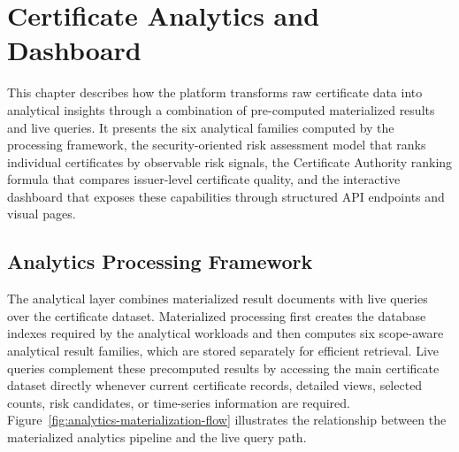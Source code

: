 
\chapter{Certificate Analytics and Dashboard}
\label{chap:analytics-api-dashboard}

This chapter describes how the platform transforms raw certificate data into
analytical insights through a combination of pre-computed materialized results
and live queries. It presents the six analytical families computed by the
processing framework, the security-oriented risk assessment model that ranks
individual certificates by observable risk signals, the Certificate Authority
ranking formula that compares issuer-level certificate quality, and the
interactive dashboard that exposes these capabilities through structured API
endpoints and visual pages.

\section{Analytics Processing Framework}
\label{sec:generic-precomputation-framework}

The analytical layer combines materialized result documents with live queries
over the certificate dataset. Materialized processing first creates the
database indexes required by the analytical workloads and then computes
six scope-aware analytical result families, which are stored separately 
for efficient retrieval. Live queries complement these precomputed results
by accessing the main certificate dataset directly whenever current certificate
records, detailed views, selected counts, risk candidates, or time-series
information are required. Figure~\ref{fig:analytics-materialization-flow}
illustrates the relationship between the materialized analytics pipeline and
the live query path.

